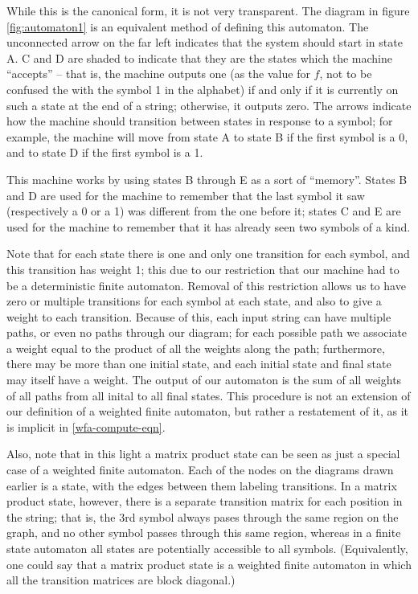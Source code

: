 \documentclass{amsbook}
\theoremstyle{plain}
\theoremstyle{definition}
\theoremstyle{remark}
\begin{document}
While this is the canonical form, it is not very transparent.  The diagram in figure \ref{fig:automaton1} is an equivalent method of defining this automaton.  The unconnected arrow on the far left indicates that the system should start in state A.  C and D are shaded to indicate that they are the states which the machine ``accepts'' -- that is, the machine outputs one (as the value for $f$, not to be confused the with the symbol 1 in the alphabet) if and only if it is currently on such a state at the end of a string;  otherwise, it outputs zero.  The arrows indicate how the machine should transition between states in response to a symbol;  for example, the machine will move from state A to state B if the first symbol is a 0, and to state D if the first symbol is a 1.

This machine works by using states B through E as a sort of ``memory''.  States B and D are used for the machine to remember that the last symbol it saw (respectively a 0 or a 1) was different from the one before it;  states C and E are used for the machine to remember that it has already seen two symbols of a kind.

Note that for each state there is one and only one transition for each symbol, and this transition has weight 1;  this due to our restriction that our machine had to be a deterministic finite automaton.  Removal of this restriction allows us to have zero or multiple transitions for each symbol at each state, and also to give a weight to each transition.  Because of this, each input string can have multiple paths, or even no paths through our diagram;  for each possible path we associate a weight equal to the product of all the weights along the path;  furthermore, there may be more than one initial state, and each initial state and final state may itself have a weight.  The output of our automaton is the sum of all weights of all paths from all inital to all final states.  This procedure is not an extension of our definition of a weighted finite automaton, but rather a restatement of it, as it is implicit in \eqref{wfa-compute-eqn}.

Also, note that in this light a matrix product state can be seen as just a special case of a weighted finite automaton.  Each of the nodes on the diagrams drawn earlier is a state, with the edges between them labeling transitions.  In a matrix product state, however, there is a separate transition matrix for each position in the string; that is, the 3rd symbol always pases through the same region on the graph, and no other symbol passes through this same region, whereas in a finite state automaton all states are potentially accessible to all symbols.  (Equivalently, one could say that a matrix product state is a weighted finite automaton in which all the transition matrices are block diagonal.)
\end{document}
